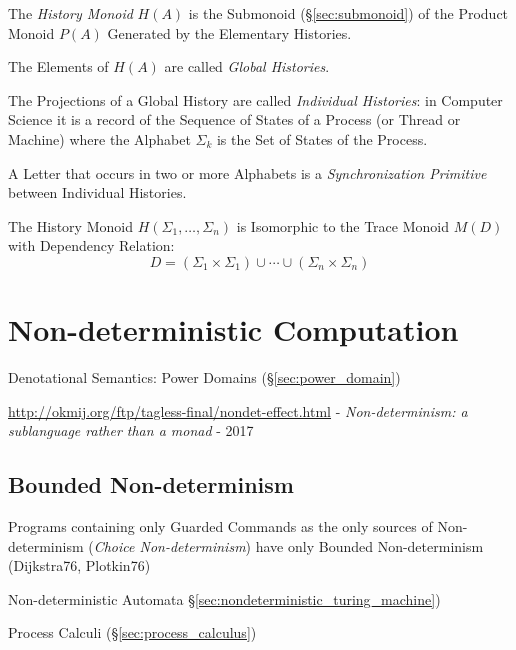 The \emph{History Monoid} $H(A)$ is the Submonoid
(\S\ref{sec:submonoid}) of the Product Monoid $P(A)$ Generated by the
Elementary Histories.

The Elements of $H(A)$ are called \emph{Global Histories}.

The Projections of a Global History are called \emph{Individual
  Histories}: in Computer Science it is a record of the Sequence of
States of a Process (or Thread or Machine) where the Alphabet
$\Sigma_k$ is the Set of States of the Process.

A Letter that occurs in two or more Alphabets is a
\emph{Synchronization Primitive} between Individual Histories.

The History Monoid $H(\Sigma_1, \ldots, \Sigma_n)$ is Isomorphic to
the Trace Monoid $M(D)$ with Dependency Relation:
\[
  D = (\Sigma_1 \times \Sigma_1) \cup \cdots
    \cup (\Sigma_n \times \Sigma_n)
\]



\section{Non-deterministic Computation}
\label{sec:nondeterministic_computation}

Denotational Semantics: Power Domains (\S\ref{sec:power_domain})

\url{http://okmij.org/ftp/tagless-final/nondet-effect.html} -
\emph{Non-determinism: a sublanguage rather than a monad} - 2017



\subsection{Bounded Non-determinism}\label{sec:bounded_nondeterminism}

Programs containing only Guarded Commands as the only sources of
Non-determinism (\emph{Choice Non-determinism}) have only Bounded
Non-determinism (Dijkstra76, Plotkin76)

\fist Non-deterministic Automata
\S\ref{sec:nondeterministic_turing_machine})

\fist Process Calculi (\S\ref{sec:process_calculus})



